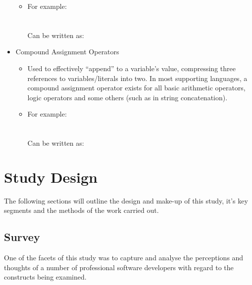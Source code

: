 \documentclass{article}
\begin{document}
\begin{itemize}
\begin{itemize}
                    \item For example:\\
                    \\\\
                    Can be written as:\\
                \end{itemize}
            \item Compound Assignment Operators
                \begin{itemize}
                    \item Used to effectively ``append'' to a variable's value, compressing three references to variables/literals into two. In most supporting languages, a compound assignment operator exists for all basic arithmetic operators, logic operators and some others (such as in string concatenation).
                    \item For example:\\
                    \\\\
                    Can be written as:\\
                \end{itemize}
        \end{itemize}
\newpage
\section{Study Design}
    The following sections will outline the design and make-up of this study, it's key segments and the methods of the work carried out.
    \subsection{Survey}
    \label{subsec:survey}
        One of the facets of this study was to capture and analyse the perceptions and thoughts of a number of professional software developers with regard to the constructs being examined.
        
\end{document}

